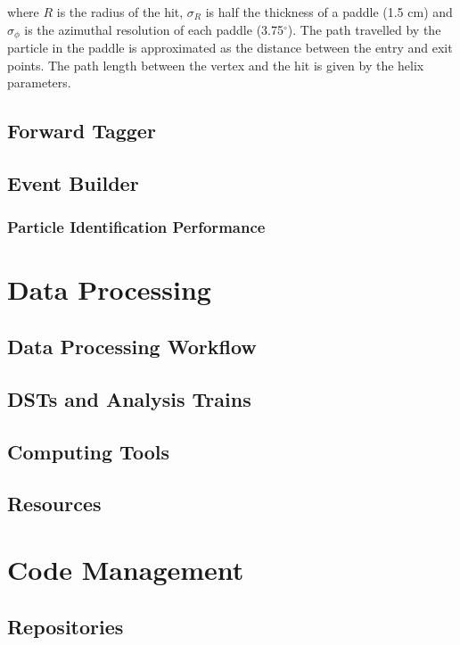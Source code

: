 \documentclass{elsart}
\begin{document}
\noindent
where $R$ is the radius of the hit, $\sigma_R$ is half the thickness of a paddle (1.5 cm) and $\sigma_{\phi}$
is the azimuthal resolution of each paddle (3.75$^{\circ}$). The path travelled by the particle in the paddle is
approximated as the distance between the entry and exit points. The path length between the vertex and the
hit is given by the helix parameters.

\subsection{Forward Tagger}

\subsection{Event Builder}

\subsubsection{Particle Identification Performance}

\section{Data Processing}

\subsection{Data Processing Workflow}

\subsection{DSTs and Analysis Trains}

\subsection{Computing Tools}

\subsection{Resources}

\section{Code Management}

\subsection{Repositories}
\end{document}
